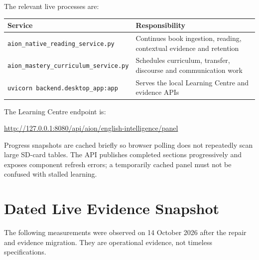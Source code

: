 \documentclass[11pt,a4paper]{article}
\begin{document}
The relevant live processes are:

\begin{longtable}{p{}p{}}
\toprule
Service & Responsibility \\
\midrule
\texttt{aion\_native\_reading\_service.py} & Continues book ingestion, reading, contextual evidence and retention \\
\texttt{aion\_mastery\_curriculum\_service.py} & Schedules curriculum, transfer, discourse and communication work \\
\texttt{uvicorn backend.desktop\_app:app} & Serves the local Learning Centre and evidence APIs \\
\bottomrule
\end{longtable}

The Learning Centre endpoint is:

\begin{center}
\url{http://127.0.0.1:8080/api/aion/english-intelligence/panel}
\end{center}

Progress snapshots are cached briefly so browser polling does not repeatedly scan large SD-card
tables.  The API publishes completed sections progressively and exposes component refresh errors;
a temporarily cached panel must not be confused with stalled learning.

\section{Dated Live Evidence Snapshot}

The following measurements were observed on 14 October 2026 after the repair and evidence
migration.  They are operational evidence, not timeless specifications.
\end{document}
